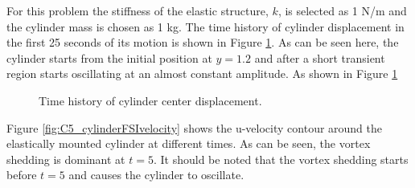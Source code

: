 For this problem the stiffness of the elastic structure, $k$, is selected as 1 N/m and the cylinder mass is chosen as 1 kg. The time history of cylinder displacement in the first 25 seconds of its motion is shown in Figure \ref{fig:C5_cylinderDisplacement}. As can be seen here, the cylinder starts from the initial position at $y=1.2$ and after a short transient region starts oscillating at an almost constant amplitude. As shown in Figure \ref{fig:C5_cylinderDisplacement}
%
\begin{figure}[H]
    \centering
    \quad
    \caption{Time history of cylinder center displacement.}
    \label{fig:C5_cylinderDisplacement}
\end{figure}
%
Figure \ref{fig:C5_cylinderFSIvelocity} shows the u-velocity contour around the elastically mounted cylinder at different times. As can be seen, the vortex shedding is dominant at $t=5$. It should be noted that the vortex shedding starts before $t=5$ and causes the cylinder to oscillate.
%
